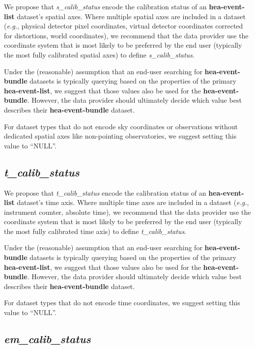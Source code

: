 \documentclass[11pt,a4paper]{ivoa}
\begin{document}
We propose that {\em s\_calib\_status\/} encode the calibration status of an {\bf hea-event-list} dataset's spatial axes. Where multiple spatial axes are included in a dataset ({\em e.g.\/}, physical detector pixel coordinates, virtual detector coordinates corrected for distortions, world coordinates), we recommend that the data provider use the coordinate system that is most likely to be preferred by the end user (typically the most fully calibrated spatial axes) to define {\em s\_calib\_status\/}.

Under the (reasonable) assumption that an end-user searching for {\bf hea-event-bundle} datasets is typically querying based on the properties of the primary {\bf hea-event-list}, we suggest that those values also be used for the {\bf hea-event-bundle}.  However, the data provider should ultimately decide which value best describes their {\bf hea-event-bundle} dataset.

For dataset types that do not encode sky coordinates or observations without dedicated spatial axes like non-pointing observatories, we suggest setting this value to ``NULL''.

\subsection{{\em t\_calib\_status}}

We propose that {\em t\_calib\_status\/} encode the calibration status of an {\bf hea-event-list} dataset's time axis.  Where multiple time axes are included in a dataset ({\em e.g.\/}, instrument counter, absolute time), we recommend that the data provider use the coordinate system that is most likely to be preferred by the end user (typically the most fully calibrated time axis) to define {\em t\_calib\_sta\-tus\/}.

Under the (reasonable) assumption that an end-user searching for {\bf hea-event-bundle} datasets is typically querying based on the properties of the primary {\bf hea-event-list}, we suggest that those values also be used for the {\bf hea-event-bundle}.  However, the data provider should ultimately decide which value best describes their {\bf hea-event-bundle} dataset.

For dataset types that do not encode time coordinates, we suggest setting this value to ``NULL''.

\subsection{{\em em\_calib\_status}}
\end{document}
